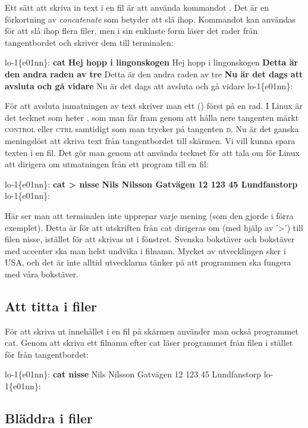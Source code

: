 \documentclass[a4paper,twocolumn]{book}
\begin{document}
Ett sätt att skriva in text i en fil är att använda kommandot
. Det är en förkortning av \emph{concatenate} som betyder
att slå ihop. Kommandot kan användas för att slå ihop flera filer, men
i sin enklaste form läser det rader från tangentbordet och skriver dem
till terminalen:
\begin{example}
lo-1\{e01nn\}: \textbf{cat}
\textbf{Hej hopp i lingonskogen}
Hej hopp i lingonskogen
\textbf{Detta är den andra raden av tre}
Detta är den andra raden av tre
\textbf{Nu är det dags att avsluta och gå vidare}
Nu är det dags att avsluta och gå vidare
\textbf{}
lo-1\{e01nn\}: 
\end{example}
För att avsluta inmatningen av text skriver man ett
 () först på en rad. I
Linux är det tecknet som heter , som man får fram genom att
hålla nere tangenten märkt\label{control} \textsc{control} eller
\textsc{ctrl} samtidigt som man trycker på tangenten \textsc{d}.
Nu är det ganska meningslöst att skriva text från tangentbordet till
skärmen. Vi vill kunna spara texten i en fil. Det gör man genom att
använda tecknet \ttindex{>} för att tala om för Linux att dirigera om
utmatningen från ett program till en fil:
\begin{example}
lo-1\{e01nn\}: \textbf{cat > nisse}
\textbf{Nils Nilsson
Gatvägen 12
123 45 Lundfanstorp}
\textbf{}
lo-1\{e01nn\}: 
\end{example}
Här ser man att terminalen inte upprepar varje mening (som den gjorde i förra exemplet). Detta är för att
utskriften från cat dirigeras om (med hjälp av '>') till filen nisse, istället för att skrivas ut i fönstret.  
Svenska bokstäver och bokstäver med accenter
ska man helst undvika i filnamn. Mycket av utvecklingen sker i USA, och det är
inte alltid utvecklarna tänker på att programmen ska fungera med våra
bokstäver.


\subsection{Att titta i filer}

För att skriva ut innehållet i en fil på skärmen använder man också
programmet cat. Genom att skriva ett filnamn efter cat läser
programmet från filen i stället för från tangentbordet:
\begin{example}
lo-1\{e01nn\}: \textbf{cat nisse}
Nils Nilsson
Gatvägen 12
123 45 Lundfanstorp
lo-1\{e01nn\}: 
\end{example}
\subsection{Bläddra i filer}
\end{document}
